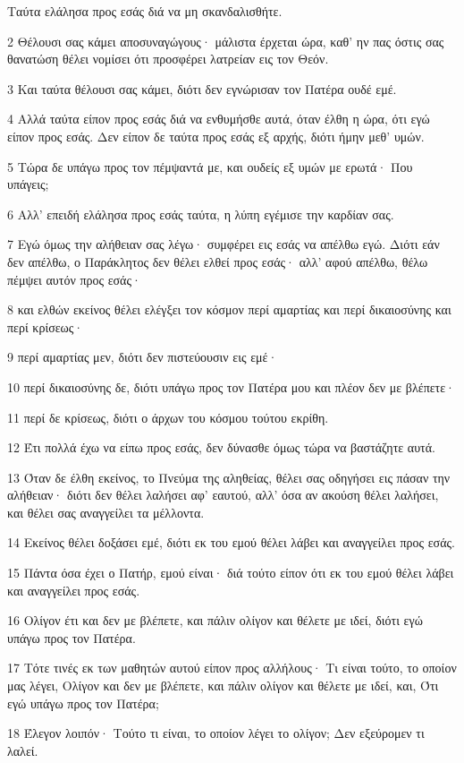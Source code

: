 \par Ταύτα ελάλησα προς εσάς διά να μη σκανδαλισθήτε.
\par 2 Θέλουσι σας κάμει αποσυναγώγους· μάλιστα έρχεται ώρα, καθ' ην πας όστις σας θανατώση θέλει νομίσει ότι προσφέρει λατρείαν εις τον Θεόν.
\par 3 Και ταύτα θέλουσι σας κάμει, διότι δεν εγνώρισαν τον Πατέρα ουδέ εμέ.
\par 4 Αλλά ταύτα είπον προς εσάς διά να ενθυμήσθε αυτά, όταν έλθη η ώρα, ότι εγώ είπον προς εσάς. Δεν είπον δε ταύτα προς εσάς εξ αρχής, διότι ήμην μεθ' υμών.
\par 5 Τώρα δε υπάγω προς τον πέμψαντά με, και ουδείς εξ υμών με ερωτά· Που υπάγεις;
\par 6 Αλλ' επειδή ελάλησα προς εσάς ταύτα, η λύπη εγέμισε την καρδίαν σας.
\par 7 Εγώ όμως την αλήθειαν σας λέγω· συμφέρει εις εσάς να απέλθω εγώ. Διότι εάν δεν απέλθω, ο Παράκλητος δεν θέλει ελθεί προς εσάς· αλλ' αφού απέλθω, θέλω πέμψει αυτόν προς εσάς·
\par 8 και ελθών εκείνος θέλει ελέγξει τον κόσμον περί αμαρτίας και περί δικαιοσύνης και περί κρίσεως·
\par 9 περί αμαρτίας μεν, διότι δεν πιστεύουσιν εις εμέ·
\par 10 περί δικαιοσύνης δε, διότι υπάγω προς τον Πατέρα μου και πλέον δεν με βλέπετε·
\par 11 περί δε κρίσεως, διότι ο άρχων του κόσμου τούτου εκρίθη.
\par 12 Έτι πολλά έχω να είπω προς εσάς, δεν δύνασθε όμως τώρα να βαστάζητε αυτά.
\par 13 Όταν δε έλθη εκείνος, το Πνεύμα της αληθείας, θέλει σας οδηγήσει εις πάσαν την αλήθειαν· διότι δεν θέλει λαλήσει αφ' εαυτού, αλλ' όσα αν ακούση θέλει λαλήσει, και θέλει σας αναγγείλει τα μέλλοντα.
\par 14 Εκείνος θέλει δοξάσει εμέ, διότι εκ του εμού θέλει λάβει και αναγγείλει προς εσάς.
\par 15 Πάντα όσα έχει ο Πατήρ, εμού είναι· διά τούτο είπον ότι εκ του εμού θέλει λάβει και αναγγείλει προς εσάς.
\par 16 Ολίγον έτι και δεν με βλέπετε, και πάλιν ολίγον και θέλετε με ιδεί, διότι εγώ υπάγω προς τον Πατέρα.
\par 17 Τότε τινές εκ των μαθητών αυτού είπον προς αλλήλους· Τι είναι τούτο, το οποίον μας λέγει, Ολίγον και δεν με βλέπετε, και πάλιν ολίγον και θέλετε με ιδεί, και, Ότι εγώ υπάγω προς τον Πατέρα;
\par 18 Έλεγον λοιπόν· Τούτο τι είναι, το οποίον λέγει το ολίγον; Δεν εξεύρομεν τι λαλεί.
